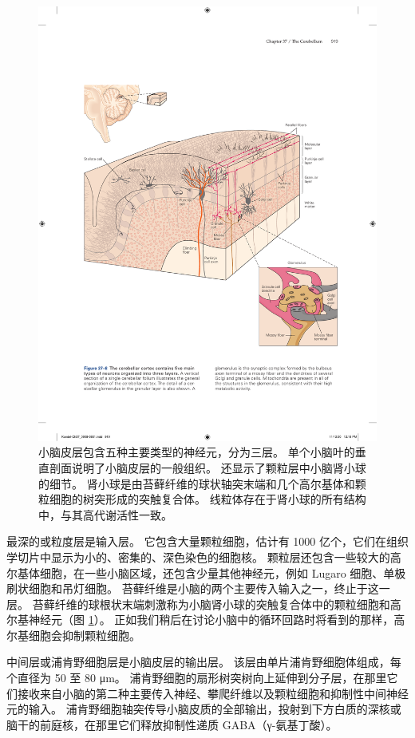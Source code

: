 \begin{figure}[htbp]
	\centering
	\includegraphics[width=0.9\linewidth]{chap37/fig_37_8}
	\caption{小脑皮层包含五种主要类型的神经元，分为三层。 单个小脑叶的垂直剖面说明了小脑皮层的一般组织。 还显示了颗粒层中小脑肾小球的细节。 肾小球是由苔藓纤维的球状轴突末端和几个高尔基体和颗粒细胞的树突形成的突触复合体。 线粒体存在于肾小球的所有结构中，与其高代谢活性一致。}
	\label{fig:37_8}
\end{figure}

最深的或粒度层是输入层。 它包含大量颗粒细胞，估计有 1000 亿个，它们在组织学切片中显示为小的、密集的、深色染色的细胞核。 颗粒层还包含一些较大的高尔基体细胞，在一些小脑区域，还包含少量其他神经元，例如 Lugaro 细胞、单极刷状细胞和吊灯细胞。 苔藓纤维是小脑的两个主要传入输入之一，终止于这一层。 苔藓纤维的球根状末端刺激称为小脑肾小球的突触复合体中的颗粒细胞和高尔基神经元（图 \ref{fig:37_8}）。 正如我们稍后在讨论小脑中的循环回路时将看到的那样，高尔基细胞会抑制颗粒细胞。

中间层或浦肯野细胞层是小脑皮层的输出层。 该层由单片浦肯野细胞体组成，每个直径为 50 至 80 μm。 浦肯野细胞的扇形树突树向上延伸到分子层，在那里它们接收来自小脑的第二种主要传入神经、攀爬纤维以及颗粒细胞和抑制性中间神经元的输入。 浦肯野细胞轴突传导小脑皮质的全部输出，投射到下方白质的深核或脑干的前庭核，在那里它们释放抑制性递质 GABA（γ-氨基丁酸）。

